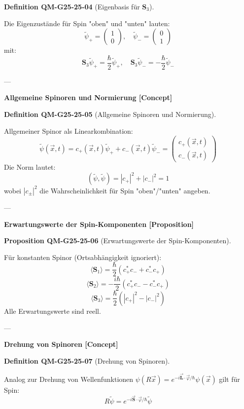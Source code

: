 \documentclass[10pt, letterpaper]{article}
\newcommand{\CustomHeading}[3]{%
  \par\medskip\noindent%
  \textbf{#1 #2} \textnormal{(#3)}.\enskip%
}
\newenvironment{DEF}[2]{\begin{unitbox}\CustomHeading{Definition}{#1}{#2}}{\end{unitbox}}
\newenvironment{PROP}[2]{\begin{unitbox}\CustomHeading{Proposition}{#1}{#2}}{\end{unitbox}}
\begin{document}
\begin{DEF}{QM-G25-25-04}{Eigenbasis für \(\mathbf{S}_3\)}
Die Eigenzustände für Spin "oben" und "unten" lauten:
\[
\tilde{\psi}_+ = \begin{pmatrix}1 \\ 0\end{pmatrix},\quad
\tilde{\psi}_- = \begin{pmatrix}0 \\ 1\end{pmatrix}
\]
mit:
\[
\mathbf{S}_3 \tilde{\psi}_+ = \frac{\hbar}{2} \tilde{\psi}_+,\quad
\mathbf{S}_3 \tilde{\psi}_- = -\frac{\hbar}{2} \tilde{\psi}_-
\]
\end{DEF}

---

\textbf{Allgemeine Spinoren und Normierung [Concept]}

\begin{DEF}{QM-G25-25-05}{Allgemeine Spinoren und Normierung}
Allgemeiner Spinor als Linearkombination:
\[
\tilde{\psi}(\vec{x}, t) = c_+(\vec{x}, t)\tilde{\psi}_+ + c_-(\vec{x}, t)\tilde{\psi}_- = \begin{pmatrix}c_+(\vec{x}, t)\\ c_-(\vec{x}, t)\end{pmatrix}
\]
Die Norm lautet:
\[
(\tilde{\psi}, \tilde{\psi}) = |c_+|^2 + |c_-|^2 = 1
\]
wobei \( |c_\pm|^2 \) die Wahrscheinlichkeit für Spin "oben"/"unten" angeben.
\end{DEF}

---

\textbf{Erwartungswerte der Spin-Komponenten [Proposition]}

\begin{PROP}{QM-G25-25-06}{Erwartungswerte der Spin-Komponenten}
Für konstanten Spinor (Ortsabhängigkeit ignoriert):
\[
\langle \mathbf{S}_1 \rangle = \frac{\hbar}{2}(c_+^*c_- + c_-^*c_+)
\]
\[
\langle \mathbf{S}_2 \rangle = -\frac{i\hbar}{2}(c_+^*c_- - c_-^*c_+)
\]
\[
\langle \mathbf{S}_3 \rangle = \frac{\hbar}{2}(|c_+|^2 - |c_-|^2)
\]
Alle Erwartungswerte sind reell.
\end{PROP}

---

\textbf{Drehung von Spinoren [Concept]}

\begin{DEF}{QM-G25-25-07}{Drehung von Spinoren}
Analog zur Drehung von Wellenfunktionen \( \psi(R\vec{x}) = e^{-i\vec{\mathbf{L}}\cdot \vec{\varphi}/\hbar} \psi(\vec{x}) \) gilt für Spin:
\[
R \tilde{\psi} = e^{-i\vec{\mathbf{S}}\cdot \vec{\varphi}/\hbar} \tilde{\psi}
\]
\end{DEF}
\end{document}
